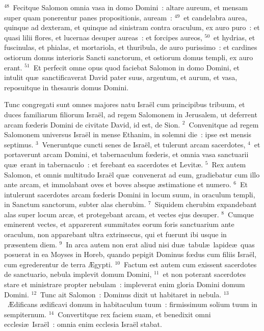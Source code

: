 ${}^{48}$~Fecitque Salomon omnia vasa in domo Domini~: altare aureum, et mensam super quam ponerentur panes propositionis, auream~:
${}^{49}$~et candelabra aurea, quinque ad dexteram, et quinque ad sinistram contra oraculum, ex auro puro~: et quasi lilii flores, et lucernas desuper aureas~: et forcipes aureos,
${}^{50}$~et hydrias, et fuscinulas, et phialas, et mortariola, et thuribula, de auro purissimo~: et cardines ostiorum domus interioris Sancti sanctorum, et ostiorum domus templi, ex auro erant.
${}^{51}$~Et perfecit omne opus quod faciebat Salomon in domo Domini, et intulit qu\ae\ sanctificaverat David pater suus, argentum, et aurum, et vasa, reposuitque in thesauris domus Domini.

\lettrine[lines=10,image=true,loversize=0.05,lraise=-0.03]{T}{}unc congregati sunt omnes majores natu Isra\"el cum principibus tribuum, et duces familiarum filiorum Isra\"el, ad regem Salomonem in Jerusalem, ut deferrent arcam fœderis Domini de civitate David, id est, de Sion.
${}^{2}$~Convenitque ad regem Salomonem universus Isra\"el in mense Ethanim, in solemni die~: ipse est mensis septimus.
${}^{3}$~Veneruntque cuncti senes de Isra\"el, et tulerunt arcam sacerdotes,
${}^{4}$~et portaverunt arcam Domini, et tabernaculum fœderis, et omnia vasa sanctuarii qu\ae\ erant in tabernaculo~: et ferebant ea sacerdotes et Levit\ae .
${}^{5}$~Rex autem Salomon, et omnis multitudo Isra\"el qu\ae\ convenerat ad eum, gradiebatur cum illo ante arcam, et immolabant oves et boves absque \ae stimatione et numero.
${}^{6}$~Et intulerunt sacerdotes arcam fœderis Domini in locum suum, in oraculum templi, in Sanctum sanctorum, subter alas cherubim.
${}^{7}$~Siquidem cherubim expandebant alas super locum arc\ae , et protegebant arcam, et vectes ejus desuper.
${}^{8}$~Cumque eminerent vectes, et apparerent summitates eorum foris sanctuarium ante oraculum, non apparebant ultra extrinsecus, qui et fuerunt ibi usque in pr\ae sentem diem.
${}^{9}$~In arca autem non erat aliud nisi du\ae\ tabul\ae\ lapide\ae\ quas posuerat in ea Moyses in Horeb, quando pepigit Dominus fœdus cum filiis Isra\"el, cum egrederentur de terra \AE gypti.
${}^{10}$~Factum est autem cum exissent sacerdotes de sanctuario, nebula implevit domum Domini,
${}^{11}$~et non poterant sacerdotes stare et ministrare propter nebulam~: impleverat enim gloria Domini domum Domini.
${}^{12}$~Tunc ait Salomon~: Dominus dixit ut habitaret in nebula.
${}^{13}$~\AE dificans \ae dificavi domum in habitaculum tuum~: firmissimum solium tuum in sempiternum.
${}^{14}$~Convertitque rex faciem suam, et benedixit omni ecclesi\ae\ Isra\"el~: omnia enim ecclesia Isra\"el stabat.
